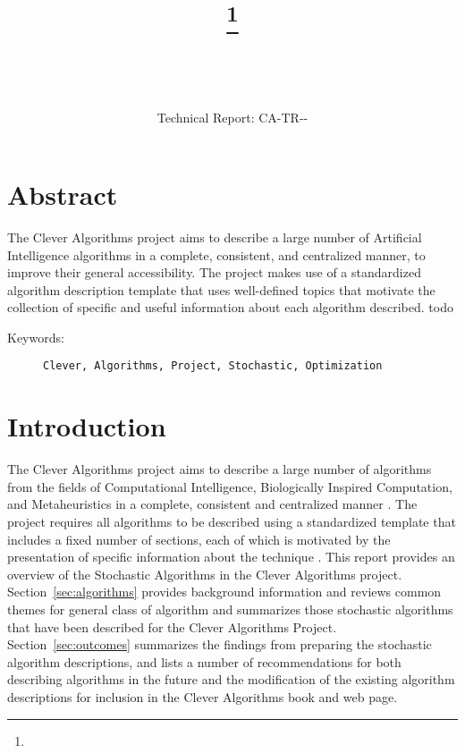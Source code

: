 \documentclass[a4paper, 11pt]{article}
\title{{\myreporttitle}\footnote{\myreportlicense}}
\author{\myreportauthor\\{\myreportemail}\\\small\myreportproject}
\date{\myreportfulldate\\{\small{Technical Report: CA-TR-{\myreportdate}-\myreportversion}}}
\begin{document}
\maketitle

\section*{Abstract} 
The Clever Algorithms project aims to describe a large number of Artificial Intelligence algorithms in a complete, consistent, and centralized manner, to improve their general accessibility. 
The project makes use of a standardized algorithm description template that uses well-defined topics that motivate the collection of specific and useful information about each algorithm described.
todo

\begin{description}
	\item[Keywords:] {\small\texttt{Clever, Algorithms, Project, Stochastic, Optimization}}
\end{description} 

\section{Introduction}
\label{sec:introduction}
The Clever Algorithms project aims to describe a large number of algorithms from the fields of Computational Intelligence, Biologically Inspired Computation, and Metaheuristics in a complete, consistent and centralized manner \cite{Brownlee2010}.
The project requires all algorithms to be described using a standardized template that includes a fixed number of sections, each of which is motivated by the presentation of specific information about the technique \cite{Brownlee2010a}.
This report provides an overview of the Stochastic Algorithms in the Clever Algorithms project. 
Section~\ref{sec:algorithms} provides background information and reviews common themes for general class of algorithm and summarizes those stochastic algorithms that have been described for the Clever Algorithms Project.
Section~\ref{sec:outcomes} summarizes the findings from preparing the stochastic algorithm descriptions, and lists a number of recommendations for both describing algorithms in the future and the modification of the existing algorithm descriptions for inclusion in the Clever Algorithms book and web page.
\end{document}
